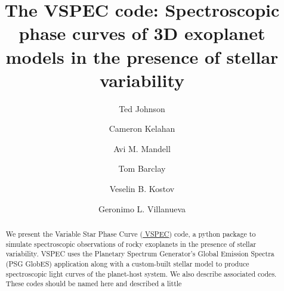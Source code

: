 \documentclass[twocolumn]{aastex631}
\newcommand{\TJ}[1]{\textcolor{tedcommentcolor}{#1}}
\begin{document}
\title{The {\sc VSPEC} code: Spectroscopic phase curves of 3D exoplanet models in the presence of stellar variability}

\author{Ted Johnson}

\author{Cameron Kelahan}

\author{Avi M. Mandell}

\author{Tom Barclay}

\author{Veselin B. Kostov}

\author{Geronimo L. Villanueva}

\begin{abstract}
    We present the Variable Star Phase Curve (\href{https://github.com/VSPEC-collab/VSPEC}{ \sc VSPEC}) code,
    a python package to simulate spectroscopic observations of rocky exoplanets in the presence of stellar variability.
    {\sc VSPEC} uses the Planetary Spectrum Generator's Global Emission Spectra (PSG GlobES) application along with a custom-built
    stellar model to produce spectroscopic light curves of the planet-host system. We also describe associated codes. \TJ{These codes should be named here and described a little}
\end{abstract}
\end{document}
